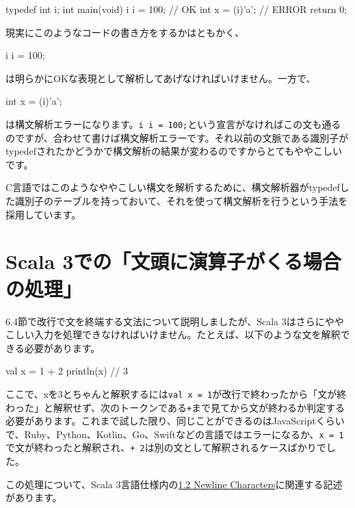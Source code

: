 \begin{codescreen}{}
typedef int i;
int main(void) {
        i i = 100; // OK
        int x = (i)'a'; // ERROR
        return 0;
}
\end{codescreen}

現実にこのようなコードの書き方をするかはともかく、

\begin{codescreen}{}
i i = 100;
\end{codescreen}

は明らかにOKな表現として解析してあげなければいけません。一方で、

\begin{codescreen}{}
int x = (i)'a';
\end{codescreen}

は構文解析エラーになります。\texttt{i\ i\ =\ 100;}という宣言がなければこの文も通るのですが、合わせて書けば構文解析エラーです。それ以前の文脈である識別子がtypedefされたかどうかで構文解析の結果が変わるのですからとてもややこしいです。

C言語ではこのようなややこしい構文を解析するために、構文解析器がtypedefした識別子のテーブルを持っておいて、それを使って構文解析を行うという手法を採用しています。

\section{Scala 3での「文頭に演算子がくる場合の処理」}

6.4節で改行で文を終端する文法について説明しましたが、Scala 3はさらにややこしい入力を処理できなければいけません。たとえば、以下のような文を解釈できる必要があります。

\begin{codescreen}{}
val x = 1
      + 2
println(x) // 3
\end{codescreen}

ここで、xを3とちゃんと解釈するには\texttt{val\ x\ =\ 1}が改行で終わったから「文が終わった」と解釈せず、次のトークンである\texttt{+}まで見てから文が終わるか判定する必要があります。これまで試した限り、同じことができるのはJavaScriptくらいで、Ruby、Python、Kotlin、Go、Swiftなどの言語ではエラーになるか、\texttt{x\ =\ 1}で文が終わったと解釈され、\texttt{+\ 2}は別の文として解釈されるケースばかりでした。

この処理について、Scala 3言語仕様内の\href{https://www.scala-lang.org/files/archive/spec/3.4/01-lexical-syntax.html}{1.2
Newline Characters}に関連する記述があります。

